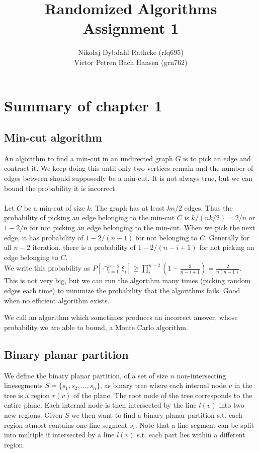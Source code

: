 \documentclass[a4paper]{article}
\author{Nikolaj Dybdahl Rathcke (rfq695) \\ Victor Petren Bach Hansen (grn762)}
\title{Randomized Algorithms \\ Assignment 1}
\begin{document}
\maketitle

\section*{Summary of chapter 1}
\subsection*{Min-cut algorithm}
An algorithm to find a min-cut in an undirected graph $G$ is to pick an edge and contract it. We keep doing this until only two vertices remain and the number of edges between should supposedly be a min-cut. It is not always true, but we can bound the probability it is incorrect. \\
\\
Let $C$ be a min-cut of size $k$. The graph has at least $kn/2$ edges. Thus the probability of picking an edge belonging to the min-cut $C$ is $k/(nk/2)=2/n$ or $1-2/n$ for not picking an edge belonging to the min-cut. When we pick the next edge, it has probability of $1-2/(n-1)$ for not belonging to $C$. Generally for all $n-2$ iteration, there is a probability of $1-2/(n-i+1)$ for not picking an edge belonging to $C$.\\
We write this probability as $P[\cap_{i=1}^{n-2} \xi_i]\geq \prod_i^{n-2} (1-\frac{2}{n-i+1})=\frac{2}{n(n-1)}$.\\

This is not very big, but we can run the algortihm many times (picking random edges each time) to minimize the probability that the algorithms fails. Good when no efficient algorithm exists.

We call an algorithm which sometimes produces an incorrect answer, whose probability we are able to bound, a Monte Carlo algorithm.

\subsection*{Binary planar partition}
We define the binary planar partition, of a set of size $n$ non-intersecting linesegments $S=\{s_1,s_2, \ldots, s_n\}$, as binary tree where each internal node $v$ in the tree is a region $r(v)$ of the plane. The root node of the tree corresponds to the entire plane. Each internal node is then intersected by the line $l(v)$ into two new regions. Given $S$ we then want to find a binary planar partition s.t. each region atmost contains one line segment $s_i$. Note that a line segment can be
split into multiple if intersected by a line $l(v)$ s.t. each part lies within a different region.\\
\end{document}
